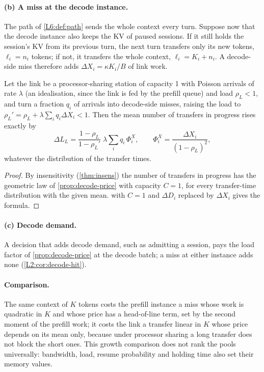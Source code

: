 \paragraph{(b) A miss at the decode instance.} The path of \cref{L6:def:path} sends
the whole context every turn. Suppose now that the decode instance also keeps the KV
of paused sessions. If it still holds the
session's KV from its previous turn, the next turn transfers only its new tokens,
$\ell_i=n_i$ tokens; if not, it transfers the whole context, $\ell_i=K_i+n_i$. A decode-side miss
therefore adds $\Delta X_i=\kappa K_i/B$ of link work.

\begin{proposition}\label{L6:prop:link-price}
Let the link be a processor-sharing station of capacity 1 with Poisson arrivals of rate
$\lambda$ (an idealisation, since the link is fed by the prefill queue) and load
$\rho_L<1$, and
turn a fraction $q_i$ of arrivals into decode-side misses, raising the load to
$\rho_L'=\rho_L+\lambda\sum_iq_i\Delta X_i<1$. Then the mean number of transfers in
progress rises exactly by
\[
  \Delta L_L=\frac{1-\rho_L}{1-\rho_L'}\;\lambda\sum_iq_i\,\Phi^X_i,\qquad
  \Phi^X_i=\frac{\Delta X_i}{(1-\rho_L)^2},
\]
whatever the distribution of the transfer times.
\end{proposition}

\begin{proof}
By insensitivity (\cref{thm:insens}) the number of transfers in progress has the
geometric law of \cref{prop:decode-price} with capacity $C=1$, for every transfer-time
distribution with the given mean.  with $C=1$ and $\Delta D_i$
replaced by $\Delta X_i$ gives the formula.
\end{proof}

\paragraph{(c) Decode demand.} A decision that adds decode demand, such as admitting a
session, pays the load factor of \cref{prop:decode-price} at the decode batch; a miss at
either instance adds none (\cref{L2:cor:decode-hit}).

\paragraph{Comparison.} The same context of $K$ tokens costs the prefill instance a
miss whose work is quadratic in $K$ and whose price has a head-of-line term, set by the
second moment of the prefill work; it costs the link a transfer linear in $K$ whose
price depends on its mean only, because under processor sharing a long transfer does not
block the short ones. This growth comparison does not rank the pools universally: bandwidth,
load, resume probability and holding time also set their memory values.

